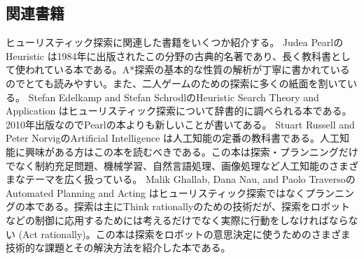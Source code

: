 \subsection{関連書籍}

ヒューリスティック探索に関連した書籍をいくつか紹介する。
Judea PearlのHeuristic \cite{pearl84}は1984年に出版されたこの分野の古典的名著であり、長く教科書として使われている本である。A*探索の基本的な性質の解析が丁寧に書かれているのでとても読みやすい。また、二人ゲームのための探索に多くの紙面を割いている。
Stefan Edelkamp and Stefan SchrodlのHeuristic Search Theory and Application \cite{edelkamp:2010:hst:1875144}はヒューリスティック探索について辞書的に調べられる本である。
2010年出版なのでPearlの本よりも新しいことが書いてある。
Stuart Russell and Peter NorvigのArtificial Intelligence \cite{russelln03}は人工知能の定番の教科書である。人工知能に興味がある方はこの本を読むべきである。この本は探索・プランニングだけでなく制約充足問題、機械学習、自然言語処理、画像処理など人工知能のさまざまなテーマを広く扱っている。
Malik Ghallab, Dana Nau, and Paolo TraversoのAutomated Planning and Acting \cite{ghallab:04}はヒューリスティック探索ではなくプランニングの本である。探索は主にThink rationallyのための技術だが、探索をロボットなどの制御に応用するためには考えるだけでなく実際に行動をしなければならない (Act rationally)。この本は探索をロボットの意思決定に使うためのさまざま技術的な課題とその解決方法を紹介した本である。


